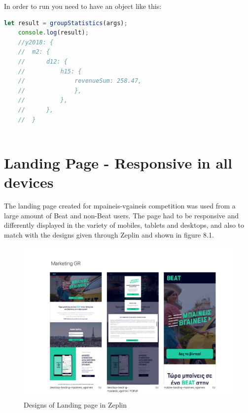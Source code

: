 	\newpage
	In order to run you need to have an object like this:
	
	\begin{lstlisting}[language=JavaScript]
	let result = groupStatistics(args);
	console.log(result);
	//y2018: {
	//	m2: {
	//		d12: {
	//			h15: {
	//				revenueSum: 258.47,
	//				},
	//			},
	//		},
	//	}
	
	\end{lstlisting}
	
	
\section{Landing Page - Responsive in all devices}

The landing page created for mpaineis-vgaineis competition was used from a large amount of Beat and non-Beat users. The page had to be responsive and differently displayed in the variety of mobiles, tablets and desktops, and also to match with the designs given through Zeplin and shown in figure 8.1.

\begin{figure}[H]
	\begin{center}
		\includegraphics[scale=0.4]{images/my_projects/landing_page/zeplin.png}
	\end{center}
	\caption{Designs of Landing page in Zeplin}
\end{figure}


